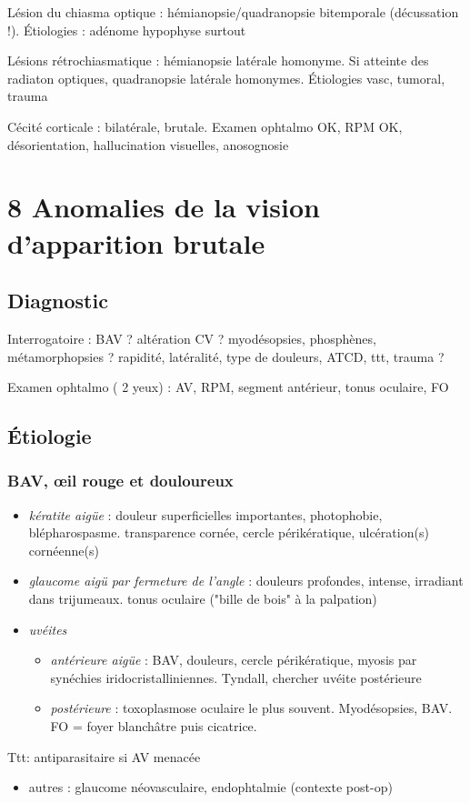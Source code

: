 \documentclass[11pt]{article}
\def\ttt{\hspace*{1cm}Ttt: }
\begin{document}
Lésion du chiasma optique : hémianopsie/quadranopsie bitemporale (décussation
!). Étiologies : adénome hypophyse surtout

Lésions rétrochiasmatique : hémianopsie latérale homonyme. Si atteinte des
radiaton optiques, quadranopsie latérale homonymes. Étiologies vasc, tumoral,
trauma

Cécité corticale : bilatérale, brutale. Examen ophtalmo OK, RPM OK,
désorientation, hallucination visuelles, anosognosie
\section{8 Anomalies de la vision d'apparition brutale}
\label{sec:org4324cdd}
\subsection{Diagnostic}
\label{sec:org9bf975a}
Interrogatoire : BAV ? altération CV ? myodésopsies,  phosphènes,
métamorphopsies ? rapidité, latéralité, type de douleurs, ATCD, ttt, trauma ?

Examen ophtalmo ( 2 yeux) : AV, RPM, segment antérieur, tonus oculaire, FO

\subsection{Étiologie}
\label{sec:org258cc0d}
\subsubsection{BAV, \oe{}il rouge et douloureux}
\label{sec:org7159359}
\begin{itemize}
\item \emph{kératite aigüe} : douleur superficielles importantes, photophobie,
blépharospasme. \dec transparence cornée, cercle périkératique, ulcération(s)
cornéenne(s)
\item \emph{glaucome aigü par fermeture de l'angle} : douleurs profondes, intense,
irradiant dans trijumeaux. \inc\inc tonus oculaire ("bille de bois" à la
palpation)
\item \emph{uvéites}
\begin{itemize}
\item \emph{antérieure aigüe} : BAV, douleurs, cercle périkératique, myosis par synéchies
iridocristalliniennes. Tyndall, chercher uvéite postérieure
\item \emph{postérieure} : toxoplasmose oculaire le plus souvent. Myodésopsies, BAV. FO =
foyer blanchâtre puis cicatrice. \\
\end{itemize}
\end{itemize}
\ttt antiparasitaire si AV menacée
\begin{itemize}
\item autres  : glaucome néovasculaire, endophtalmie (contexte post-op)
\end{itemize}
\end{document}
